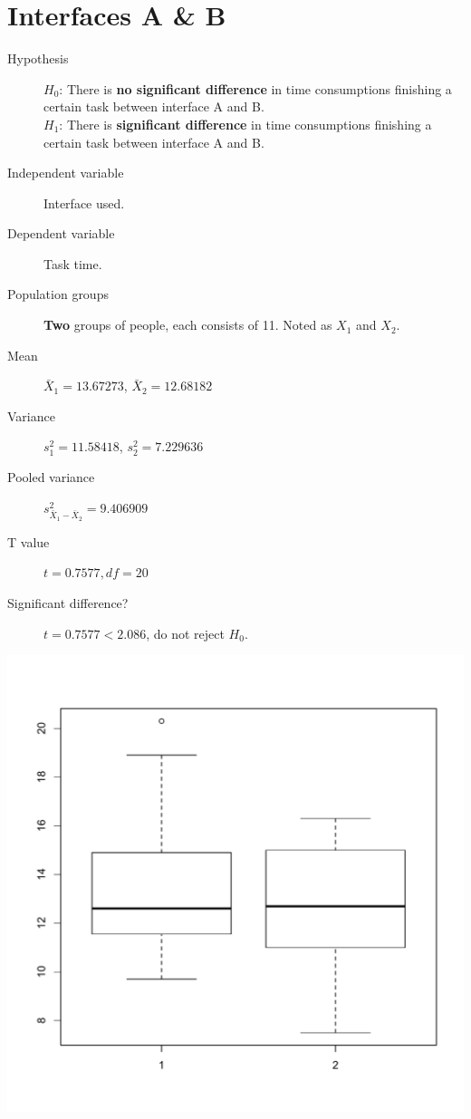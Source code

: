 \documentclass[a4paper,10pt,twocolumn]{article}
\begin{document}
\section{Interfaces A \& B} %
\label{sec:interfaces_a_&_b}
\begin{description}
	\item[Hypothesis] 
		$H_0$: There is \textbf{no significant difference} in time consumptions finishing a certain task between interface A and B.\\
		$H_1$: There is \textbf{significant difference} in time consumptions finishing a certain task between interface A and B.
	\item[Independent variable] Interface used.
	\item[Dependent variable] Task time.
	\item[Population groups] \textbf{Two} groups of people, each consists of 11. Noted as $X_1$ and $X_2$.
	\item[Mean] $\bar{X}_1=13.67273$, $\bar{X}_2=12.68182$
	\item[Variance] $s_1^2=11.58418$, $s_2^2=7.229636$
	\item[Pooled variance] $s_{\bar{X}_1-\bar{X}_2}^2=9.406909$
	\item[T value] $t = 0.7577, df = 20$
	\item[Significant difference?] $t = 0.7577 < 2.086$, do not reject $H_0$.
\end{description}
\includegraphics[width=.5\textwidth]{interface.pdf}
\end{document}
